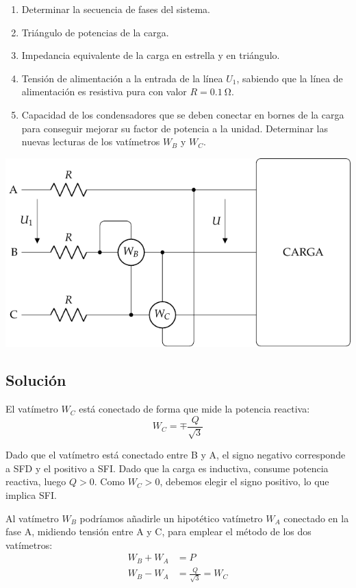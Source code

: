 \begin{enumerate}
\item Determinar la secuencia de fases del sistema.
\item Triángulo de potencias de la carga.
\item Impedancia equivalente de la carga en estrella y
  en triángulo.
\item Tensión de alimentación a la entrada de la línea
  $U_1$, sabiendo que la línea de alimentación es resistiva pura con
  valor $R = \SI{0.1}{\ohm}$.
\item Capacidad de los condensadores que se deben
  conectar en bornes de la carga para conseguir mejorar su factor de
  potencia a la unidad. Determinar las nuevas lecturas de los
  vatímetros $W_B$ y $W_C$.
\end{enumerate}

\begin{center}
  \includegraphics[width=0.65\linewidth]{figuras/BT3_10.pdf}
\end{center}

\subsection*{Solución}

El vatímetro $W_C$ está conectado de forma que mide la potencia
reactiva:
\[
  W_C = \mp \frac{Q}{\sqrt{3}}
\]

Dado que el vatímetro está conectado entre B y A, el signo negativo
corresponde a SFD y el positivo a SFI. Dado que la carga es inductiva, consume potencia reactiva, luego $Q > 0$. Como $W_C > 0$, debemos elegir el signo positivo, lo que
implica SFI.

\vspace{2mm}
Al vatímetro $W_B$ podríamos añadirle un hipotético vatímetro
$W_A$ conectado en la fase A, midiendo tensión entre A y C, para
emplear el método de los dos vatímetros:
\begin{align*}
W_B + W_A &= P\\
W_B - W_A &= \frac{Q}{\sqrt{3}} = W_C
\end{align*}

